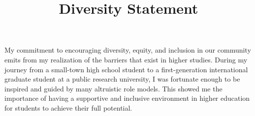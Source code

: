 \documentclass[9pt]{article}
\title{
\vspace{-3em}
\textbf{Diversity Statement} \hfill \href{https://ksolaiman.github.io/}{\textit{\Name}}
\vspace{-2.5em}
}
\date{}
\makeatletter
\def \paragraph {%
    \@startsection{paragraph}%
        {4}%
        \z@\z@{-\fontdimen 6 \font}%
        {\large \scshape \bfseries}%
    }
\makeatother
\begin{document}
\maketitle
\pagestyle{plain}

\noindent My commitment to encouraging diversity, equity, and inclusion in our community emits from my realization of the barriers that exist in higher studies.
During my journey from %
a small-town high school student to a first-generation international graduate student at a public research university, I was fortunate enough to be inspired and guided by many
altruistic %
role models.
This showed me the importance of having a supportive and inclusive environment in higher education 
for students to achieve their full potential. 
\end{document}
